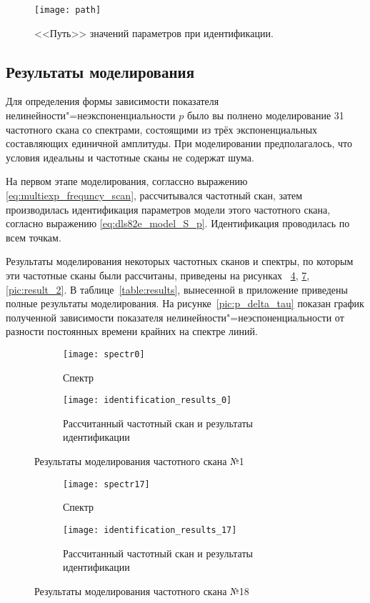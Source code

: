 	\begin{figure}[h!]
		\centering
		\texttt{[image: path]}
		\caption{<<Путь>> значений параметров при идентификации.}
		\label{pic:param_path}
	\end{figure}


	\subsection{Результаты моделирования}

	Для определения формы зависимости показателя 
	нелинейности"=неэкспоненциальности $p$ было вы полнено моделирование 
	31 частотного скана со спектрами, состоящими из трёх экспоненциальных
	составляющих единичной амплитуды. При моделировании предполагалось,
	что условия идеальны и частотные сканы не содержат шума.

	На первом этапе моделирования, соглассно выражению \ref{eq:multiexp_frequncy_scan},
	рассчитывался частотный скан, затем производилась идентификация 
	параметров модели этого частотного скана, согласно выражению 
	\ref{eq:dls82e_model_S_p}. Идентификация проводилась по всем точкам.

	Результаты моделирования некоторых частотных сканов и спектры, по 
	которым эти частотные сканы были рассчитаны, приведены на рисунках~
	\ref{pic:result_0},	\ref{pic:result_1}, \ref{pic:result_2}. 
	В таблице~\ref{table:results}, вынесенной в приложение приведены 
	полные результаты моделирования. На рисунке~\ref{pic:p_delta_tau} 
	показан график полученной зависимости показателя	
	нелинейности"=неэспоненциальности от разности постоянных времени
	крайних на спектре линий.

	\begin{figure}[h!]
		\centering
		\begin{subfigure}[c]{0.3\textwidth}
			\texttt{[image: spectr0]}
			\caption{Спектр}
			\label{pic:results_0_spectr}
		\end{subfigure}
		\begin{subfigure}[c]{0.4\textwidth}
			\texttt{[image: identification\_results\_0]}
			\caption{Рассчитанный частотный скан и результаты идентификации}
			\label{pic:results_0_scan}
		\end{subfigure}
		\caption{Результаты моделирования частотного скана №1}
		\label{pic:result_0}
	\end{figure}

	\begin{figure}[h!]
		\centering
		\begin{subfigure}[c]{0.3\textwidth}
			\texttt{[image: spectr17]}
			\caption{Спектр}
			\label{pic:results_1_spectr}
		\end{subfigure}
		\begin{subfigure}[c]{0.4\textwidth}
			\texttt{[image: identification\_results\_17]}
			\caption{Рассчитанный частотный скан и результаты идентификации}
			\label{pic:results_1_scan}
		\end{subfigure}
		\caption{Результаты моделирования частотного скана №18}
		\label{pic:result_1}
	\end{figure}

